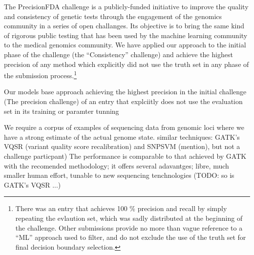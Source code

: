 \documentclass{article}
\begin{document}
The PrecisionFDA challenge is a publicly-funded initiative to improve the quality and consistency of genetic tests through the engagement of the genomics community in a series of open challanges.
Its objective is to bring the same kind of rigorous public testing that has been used by the machine learning community to the medical genomics community.
We have applied our approach to the initial phase of the challenge (the ``Consistency'' challenge) and achieve the highest precision of any method which explicitly did not use the truth set in any phase of the submission process.\footnote{There was an entry that achieves 100 \% precision and recall by simply repeating the evlaution set, which was sadly distributed at the beginning of the challenge. Other submissions provide no more than vague reference to a ``ML'' approach used to filter, and do not exclude the use of the truth set for final decision boundary selection.}

Our models base approach achieving the highest precision in the initial challenge (The precision challenge) of an entry that explciitly does not use the evaluation set in its training or paramter tunning 


We require a corpus of examples of sequencing data from genomic loci where we have a strong estimate of the actual genome state. %
 similar techniques: GATK's VQSR (variant quality score recalibration) and SNPSVM (mention), but not a challenge particpant)
The performance is comparable to that achieved by GATK with the recomended methodology; it offers several adavantges; libre, much smaller human effort, tunable to new sequencing tenchnologies (TODO: so is GATK's VQSR ...) 


\end{document}
